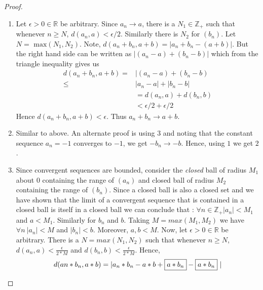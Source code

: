 \begin{proof}
    \begin{enumerate}
	\item Let $\epsilon > 0 \in \mathbb{R}$ be arbitrary. Since $a_n \rightarrow a$, 
	there is a $N_1 \in \mathbb{Z}_+$ such that whenever $n\geq N$, $d(a_n,a) < \epsilon/2$.
	Similarly there is $N_2$ for $\left(b_n\right)$. Let $N = \text{ max}(N_1,N_2)$. Note,
	$d(a_n + b_n, a+b) = \lvert a_n + b_n - (a+b) \rvert$. But the right hand side can be
	written as $\lvert (a_n - a) + (b_n - b)\rvert$ which from the triangle inequality gives us
	\begin{displaymath}
	    \begin{aligned}
		d(a_n + b_n, a + b) = & \lvert (a_n - a) + (b_n - b) \\
		\leq & \lvert a_n - a \rvert + \lvert b_n - b \rvert \\
		& = d(a_n,a) + d(b_n,b) \\
		& < \epsilon/2 + \epsilon/2 
	    \end{aligned}
	\end{displaymath}
	Hence $d(a_n + b_n, a+b) < \epsilon$. Thus $a_n + b_n \rightarrow a+b$.
	\item Similar to above. An alternate proof is using $3$ and noting that the constant
	    sequence $a_n = -1$ converges to $-1$, we get $-b_n \rightarrow -b$. Hence, 
	using $1$ we get $2$.
	\item Since convergent sequences are bounded, consider the \emph{closed} ball of radius
	    $M_1$ about $0$ containing the range of $\left(a_n\right)$ and closed ball of radius 
	    $M_2$ containing the range of $\left(b_n\right)$. Since a closed ball is also a closed
	    set and we have shown that the limit of a convergent sequence that is contained in a
	    closed ball is itself in a closed ball we can conclude that :
	    $\forall n \in \mathbb{Z}_+ \lvert a_n \rvert < M_1$ and $a < M_1$. Similarly for $b_n$
	    and $b$. Taking $M = max(M_1,M_2)$ we have $\forall n \ \lvert a_n \rvert < M $ and
	    $\lvert b_n \rvert < b$. Moreover, $a,b < M$. Now, let $\epsilon > 0 \in \mathbb{R}$ be
	    arbitrary. There is a $N = max(N_1,N_2)$ such that whenever $n \geq N$, $d(a_n,a) <
	    \frac{\epsilon}{2*M}$ and $d(b_n,b) < \frac{\epsilon}{2*M}$. Hence,
	    \begin{displaymath}
		\begin{aligned}
		    d(an*b_n, a*b) & =  \lvert a_n*b_n - a*b +\text{\fbox{$a*b_n$}} -
		    \text{\fbox{$a*b_n$}} \ \rvert \\

\end{aligned}
\end{displaymath}
\end{enumerate}
\end{proof}
